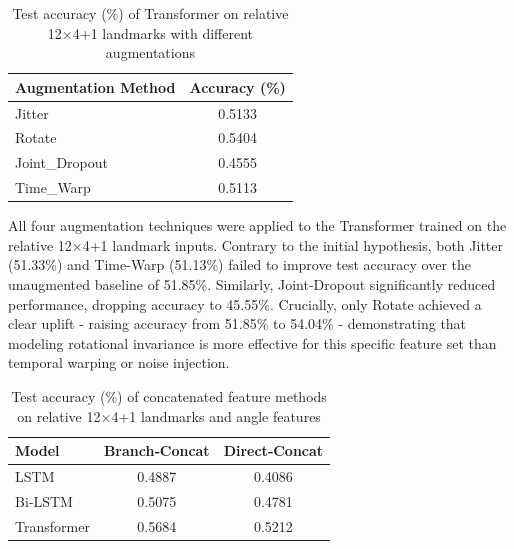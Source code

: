 \documentclass[runningheads]{llncs}
\begin{document}
\begin{table}[!h]
\centering
\caption{Test accuracy (\%) of Transformer on relative 12$\times$4+1 landmarks with different augmentations}
\label{tab:augmentation-results}
\begin{tabular}{l c}
\hline
\textbf{Augmentation Method} & \textbf{Accuracy (\%)} \\
\hline
Jitter                       & 0.5133                 \\
Rotate                       & 0.5404                \\
Joint\_Dropout          & 0.4555                 \\
Time\_Warp                & 0.5113                 \\
\hline
\end{tabular}
\end{table}

All four augmentation techniques were applied to the Transformer trained on the relative 12$\times$4+1 landmark inputs. Contrary to the initial hypothesis, both Jitter (51.33\%) and Time-Warp (51.13\%) failed to improve test accuracy over the unaugmented baseline of 51.85\%. Similarly, Joint-Dropout significantly reduced performance, dropping accuracy to 45.55\%. Crucially, only Rotate achieved a clear uplift - raising accuracy from 51.85\% to 54.04\% - demonstrating that modeling rotational invariance is more effective for this specific feature set than temporal warping or noise injection.

\begin{table}[!h]
\centering
\caption{Test accuracy (\%) of concatenated feature methods on relative 12$\times$4+1 landmarks and angle features}
\label{tab:concat-results}
\begin{tabular}{l c c}
\hline
\textbf{Model}    & \textbf{Branch‐Concat} & \textbf{Direct‐Concat} \\
\hline
LSTM              & 0.4887                 & 0.4086                 \\
Bi‐LSTM           & 0.5075                 & 0.4781                 \\
Transformer   & 0.5684                 & 0.5212                 \\
\hline
\end{tabular}
\end{table}
\end{document}
